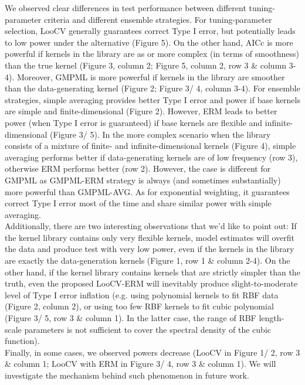 \documentclass[11pt]{article}
\begin{document}
We observed clear differences in test performance between different tuning-parameter criteria and different ensemble strategies. For tuning-parameter selection, LooCV generally guarantees correct Type I error, but potentially leads to low power under the alternative (Figure 5). On the other hand, AICc is more powerful if kernels in the library are as or more complex (in terms of smoothness) than the true kernel (Figure 3, column 2; Figure 5, column 2, row 3 \& column 3-4). Moreover, GMPML is more powerful if kernels in the library are smoother than the data-generating kernel (Figure 2; Figure 3/ 4, column 3-4). For ensemble strategies, simple averaging provides better Type I error and power if base kernels are simple and finite-dimensional (Figure 2). However, ERM leads to better power (when Type I error is guaranteed) if base kernels are flexible and infinite-dimensional (Figure 3/ 5). In the more complex scenario when the library consists of a mixture of finite- and infinite-dimensional kernels (Figure 4), simple averaging performs better if data-generating kernels are of low frequency (row 3), otherwise ERM performs better (row 2). However, the case is different for GMPML as GMPML-ERM strategy is always (and sometimes substantially) more powerful than GMPML-AVG. As for exponential weighting, it guarantees correct Type I error most of the time and share similar power with simple averaging.\\

Additionally, there are two interesting observations that we'd like to point out: 
If the kernel library contains only very flexible kernels, model estimates will overfit the data and produce test with very low power, even if the kernels in the library are exactly the data-generation kernels (Figure 1, row 1 \& column 2-4). On the other hand, if the kernel library contains kernels that are strictly simpler than the truth, even the proposed LooCV-ERM will inevitably produce slight-to-moderate level of Type I error inflation (e.g. using polynomial kernels to fit RBF data (Figure 2, column 2), or using too few RBF kernels to fit cubic polynomial (Figure 3/ 5, row 3 \& column 1). In the latter case, the range of RBF  length-scale parameters is not sufficient to cover the spectral density of the cubic function).\\

Finally, in some cases, we observed powers decrease (LooCV in Figure 1/ 2, row 3 \& column 1; LooCV with ERM in Figure 3/ 4, row 3 \& column 1). We will investigate the mechanism behind such phenomenon in future work.
\end{document}
